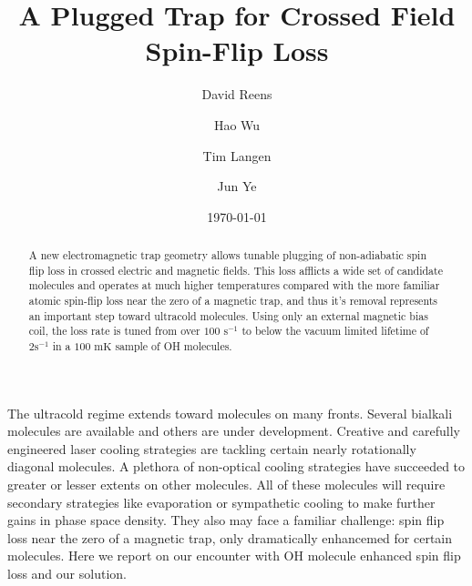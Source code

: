 \documentclass[%
 reprint,
 amsmath,amssymb,
 aps,
prl,
]{revtex4-1}
\begin{document}

\title{A Plugged Trap for Crossed Field Spin-Flip Loss}%


\author{David Reens}%
\author{Hao Wu}
\author{Tim Langen}%
\author{Jun Ye}
%

\date{\today}%


\begin{abstract}
A new electromagnetic trap geometry allows tunable plugging of non-adiabatic spin flip loss in crossed electric and magnetic fields. This loss afflicts a wide set of candidate molecules and operates at much higher temperatures compared with the more familiar atomic spin-flip loss near the zero of a magnetic trap, and thus it's removal represents an important step toward ultracold molecules. Using only an external magnetic bias coil, the loss rate is tuned from over $100 \text{ s}^{-1} $ to below the vacuum limited lifetime of $2 \text{s}^{-1}$ in a $100 \text{ mK}$ sample of OH molecules.
\end{abstract}


\maketitle


%
%
The ultracold regime extends toward molecules on many fronts. Several bialkali molecules are available and others are under development. Creative and carefully engineered laser cooling strategies are tackling certain nearly rotationally diagonal molecules. A plethora of non-optical cooling strategies have succeeded to greater or lesser extents on other molecules. All of these molecules will require secondary strategies like evaporation or sympathetic cooling to make further gains in phase space density. They also may face a familiar challenge: spin flip loss near the zero of a magnetic trap, only dramatically enhancemed for certain molecules. Here we report on our encounter with OH molecule enhanced spin flip loss and our solution.
\end{document}
